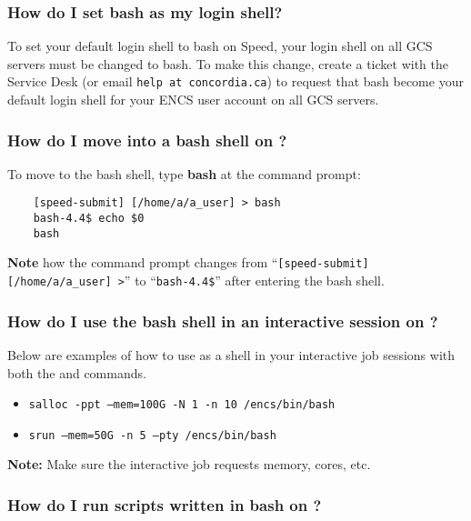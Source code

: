 \subsubsection{How do I set bash as my login shell?}
To set your default login shell to bash on Speed, your login shell on all GCS servers must be changed to bash.
To make this change, create a ticket with the Service Desk (or email \texttt{help at concordia.ca}) to
request that bash become your default login shell for your ENCS user account on all GCS servers.

\subsubsection{How do I move into a bash shell on ?}
To move to the bash shell, type \textbf{bash} at the command prompt:
\begin{verbatim}
	[speed-submit] [/home/a/a_user] > bash
	bash-4.4$ echo $0
	bash
\end{verbatim}	

\noindent \textbf{Note} how the command prompt changes from 
``\verb![speed-submit] [/home/a/a_user] >!'' to ``\verb!bash-4.4$!'' after entering the bash shell.

\subsubsection{How do I use the bash shell in an interactive session on ?}
Below are examples of how to use  as a shell in your interactive job sessions 
with both the  and  commands.

\begin{itemize}
	\item \texttt{salloc -ppt --mem=100G -N 1 -n 10 /encs/bin/bash}
	\item \texttt{srun  --mem=50G -n 5 --pty /encs/bin/bash}
\end{itemize}

\noindent\textbf{Note:} Make sure the interactive job requests memory, cores, etc.

\subsubsection{How do I run scripts written in bash on ?}

